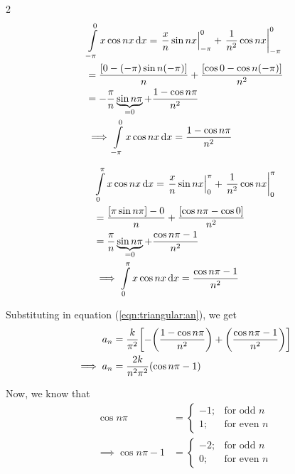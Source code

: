 \begin{itemize}
\begin{multicols}{2}
                \begin{align*}
                    &\int\limits_{-\pi}^{0}{x\cos{nx}\dd{x}}=\left.\dfrac{x}{n}\sin{nx}\right|_{-\pi}^{0}+\left.\dfrac{1}{n^2}\cos{nx}\right|_{-\pi}^{0} \\
                    &=\dfrac{\qty[0-(-\pi)\sin n(-\pi)]}{n}+\dfrac{\qty[\cos{0}-\cos{n(-\pi)}]}{n^2} \\
                    &=-\dfrac{\pi}{n}\underbrace{\sin{n\pi}}_{=0}+\dfrac{1-\cos{n\pi}}{n^2} \\
                    &\implies\int\limits_{-\pi}^{0}{x\cos{nx}\dd{x}}=\dfrac{1-\cos{n\pi}}{n^2}
                \end{align*}

                \begin{align*}
                    &\int\limits_{0}^{\pi}{x\cos{nx}\dd{x}}=\left.\dfrac{x}{n}\sin{nx}\right|_{0}^{\pi}+\left.\dfrac{1}{n^2}\cos{nx}\right|_{0}^{\pi} \\
                    &=\dfrac{\qty[\pi\sin n\pi]-0}{n}+\dfrac{\qty[\cos{n\pi}-\cos{0}]}{n^2} \\
                    &=\dfrac{\pi}{n}\underbrace{\sin{n\pi}}_{=0}+\dfrac{\cos{n\pi}-1}{n^2} \\
                    &\implies\int\limits_{0}^{\pi}{x\cos{nx}\dd{x}}=\dfrac{\cos{n\pi}-1}{n^2}
                \end{align*}
                
            \end{multicols}

            Substituting in equation (\ref{eqn:triangular:an}), we get
            \begin{align*}
                a_n&=\dfrac{k}{\pi^2}\qty[-\qty(\dfrac{1-\cos{n\pi}}{n^2})+\qty(\dfrac{\cos{n\pi}-1}{n^2})] \\
                \implies a_n&=\dfrac{2k}{n^2\pi^2}\qty(\cos{n\pi}-1)
            \end{align*}
            
            Now, we know that
            \begin{align*}
                \cos{n\pi}&=\begin{cases}
                    {-1;} & {\text{for odd }n} \\
                    {1;} & {\text{for even }n}
                \end{cases} \\
                \implies \cos{n\pi}-1&=\begin{cases}
                    {-2;} & {\text{for odd }n} \\
                    {0;} & {\text{for even }n}
                \end{cases}
            \end{align*}


\end{itemize}
